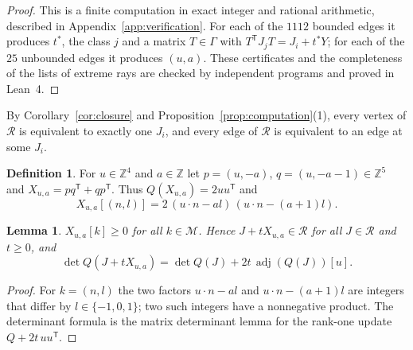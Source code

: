\documentclass[11pt]{amsart}
\newtheorem{lemma}[theorem]{Lemma}
\theoremstyle{definition}
\newtheorem{definition}[theorem]{Definition}
\theoremstyle{remark}
\numberwithin{equation}{section}
\numberwithin{table}{section}
\numberwithin{figure}{section}
\newcommand{\Z}{\mathbb{Z}}
\newcommand{\M}{\mathcal{M}}
\newcommand{\Rk}{\mathcal{R}}
\newcommand{\adj}{\operatorname{adj}}
\begin{document}
\begin{proof}
This is a finite computation in exact integer and rational arithmetic, described in Appendix~\ref{app:verification}. For each of the $1112$ bounded edges it produces $t^*$, the class $j$ and a matrix $T\in\Gamma$ with $T^{\mathsf T}J_jT=J_i+t^*Y$; for each of the $25$ unbounded edges it produces $(u,a)$. These certificates and the completeness of the lists of extreme rays are checked by independent programs and proved in Lean~4.
\end{proof}

By Corollary~\ref{cor:closure} and Proposition~\ref{prop:computation}(1), every vertex of $\Rk$ is equivalent to exactly one $J_i$, and every edge of $\Rk$ is equivalent to an edge at some $J_i$.

\begin{definition}\label{def:Xua}
For $u\in\Z^4$ and $a\in\Z$ let $p=(u,-a)$, $q=(u,-a-1)\in\Z^5$ and $X_{u,a}=pq^{\mathsf T}+qp^{\mathsf T}$. Thus $Q(X_{u,a})=2uu^{\mathsf T}$ and
\[
X_{u,a}[(n,l)]=2\,(u\cdot n-al)\,(u\cdot n-(a+1)l).
\]
\end{definition}

\begin{lemma}\label{lem:Xua}
$X_{u,a}[k]\ge0$ for all $k\in\M$. Hence $J+tX_{u,a}\in\Rk$ for all $J\in\Rk$ and $t\ge0$, and
\[
\det Q(J+tX_{u,a})=\det Q(J)+2t\,\adj(Q(J))[u].
\]
\end{lemma}

\begin{proof}
For $k=(n,l)$ the two factors $u\cdot n-al$ and $u\cdot n-(a+1)l$ are integers that differ by $l\in\{-1,0,1\}$; two such integers have a nonnegative product. The determinant formula is the matrix determinant lemma for the rank-one update $Q+2t\,uu^{\mathsf T}$.
\end{proof}
\end{document}

